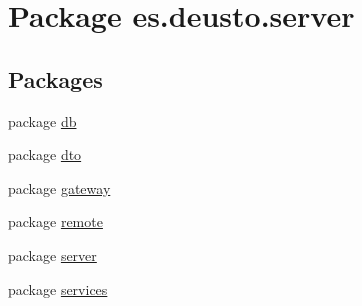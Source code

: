 \hypertarget{namespacees_1_1deusto_1_1server}{}\section{Package es.\+deusto.\+server}
\label{namespacees_1_1deusto_1_1server}
\subsection*{Packages}
\begin{DoxyCompactItemize}
\item 
package \mbox{\hyperlink{namespacees_1_1deusto_1_1server_1_1db}{db}}
\item 
package \mbox{\hyperlink{namespacees_1_1deusto_1_1server_1_1dto}{dto}}
\item 
package \mbox{\hyperlink{namespacees_1_1deusto_1_1server_1_1gateway}{gateway}}
\item 
package \mbox{\hyperlink{namespacees_1_1deusto_1_1server_1_1remote}{remote}}
\item 
package \mbox{\hyperlink{namespacees_1_1deusto_1_1server_1_1server}{server}}
\item 
package \mbox{\hyperlink{namespacees_1_1deusto_1_1server_1_1services}{services}}
\end{DoxyCompactItemize}
